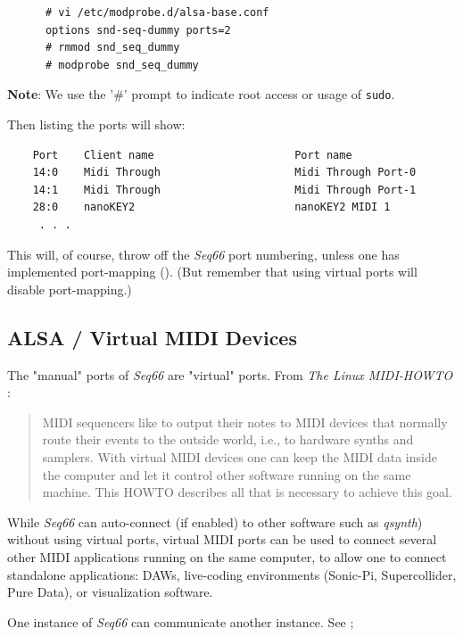   \begin{verbatim}
      # vi /etc/modprobe.d/alsa-base.conf
      options snd-seq-dummy ports=2
      # rmmod snd_seq_dummy
      # modprobe snd_seq_dummy
   \end{verbatim}

   \textbf{Note}: We use the '\#' prompt to indicate root access or
   usage of \texttt{sudo}.

   Then listing the ports will show:

   \begin{verbatim}
    Port    Client name                      Port name
    14:0    Midi Through                     Midi Through Port-0
    14:1    Midi Through                     Midi Through Port-1
    28:0    nanoKEY2                         nanoKEY2 MIDI 1
     . . .
   \end{verbatim}

   This will, of course, throw off the \textsl{Seq66} port numbering, unless
   one has implemented port-mapping ().
   (But remember that using virtual ports will disable port-mapping.)

\subsection{ALSA / Virtual MIDI Devices}
\label{subsec:alsa_virtual_midi_devices}

   The "manual" ports of \textsl{Seq66} are "virtual" ports.
   From \textsl{The Linux MIDI-HOWTO} \cite{midihowto}:

   \begin{quote}
   MIDI sequencers like to output their notes to MIDI devices that normally
   route their events to the outside world, i.e., to hardware synths and
   samplers. With virtual MIDI devices one can keep the MIDI data inside the
   computer and let it control other software running on the same machine. This
   HOWTO describes all that is necessary to achieve this goal.
   \end{quote}

   While \textsl{Seq66} can auto-connect (if enabled) to other software
   such as \textsl{qsynth}) without using virtual ports, virtual MIDI
   ports can be used to connect several other MIDI applications running on the
   same computer, to allow one to connect standalone applications: DAWs,
   live-coding environments (Sonic-Pi, Supercollider, Pure Data), or
   visualization software.

   One instance of \textsl{Seq66} can communicate
   another instance.
   See ;

